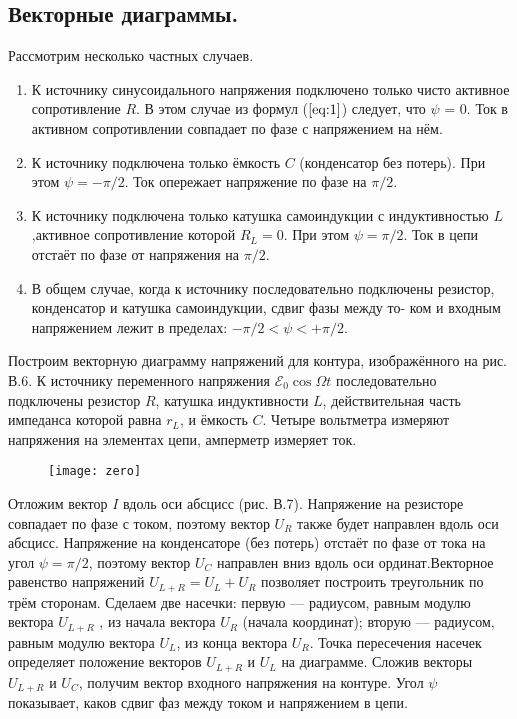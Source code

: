 \documentclass[12pt,a4paper]{article}
\begin{document}
    \subsection{Векторные диаграммы.}
        Рассмотрим несколько частных случаев.
        \begin{enumerate}
            \item К источнику синусоидального напряжения подключено только чисто активное сопротивление $R$. В этом случае из формул ($\ref{eq:1}$) следует, что $\psi$ = 0. Ток в активном сопротивлении совпадает по фазе с напряжением на нём.
            \item К источнику подключена только ёмкость $C$ (конденсатор без потерь). При этом $\psi = −\pi/2$. Ток опережает напряжение по фазе на $\pi/2$.
            \item К источнику подключена только катушка самоиндукции с индуктивностью $L$,активное сопротивление которой $R_L = 0$. При этом $\psi = \pi/2$. Ток в цепи отстаёт по фазе от напряжения на $\pi/2$.
            \item В общем случае, когда к источнику последовательно подключены резистор, конденсатор и катушка самоиндукции, сдвиг фазы между то- ком и входным напряжением лежит в пределах: $−\pi/2 < \psi < +\pi/2$.
        \end{enumerate}
        
        Построим векторную диаграмму напряжений для контура, изображённого на рис. В.6. К источнику переменного напряжения $\mathscr{E}_0\cos{\Omega t}$ последовательно подключены резистор $R$, катушка индуктивности $L$, действительная часть импеданса которой равна $r_L$, и ёмкость $C$. Четыре вольтметра измеряют напряжения на элементах цепи, амперметр измеряет ток.
        \begin{figure}[h!]
        	\begin{center}
        		\texttt{[image: zero]}\\
            	{\scriptsize
            	\begin{center}
            	\end{center}}
        	\end{center}
            \label{scheme1}
        \end{figure}
        
        Отложим вектор $I$ вдоль оси абсцисс (рис. В.7). Напряжение на резисторе совпадает по фазе с током, поэтому вектор $U_R$ также будет направлен вдоль оси абсцисс. Напряжение на конденсаторе (без потерь) отстаёт по фазе от тока на угол $\psi = \pi/2$, поэтому вектор $U_C$ направлен вниз вдоль оси ординат.Векторное равенство напряжений $U_{L+R} = U_L + U_R$ позволяет построить треугольник по трём сторонам. Сделаем две насечки: первую — радиусом, равным модулю вектора $U_{L+R}$ , из начала вектора $U_R$ (начала координат); вторую — радиусом, равным модулю вектора $U_L$, из конца вектора $U_R$. Точка пересечения насечек определяет положение векторов $U_{L+R}$ и $U_L$ на диаграмме. Сложив векторы $U_{L+R}$ и $U_C$, получим вектор входного напряжения на контуре. Угол $\psi$ показывает, каков сдвиг фаз между током и напряжением в цепи.
        
\end{document}
